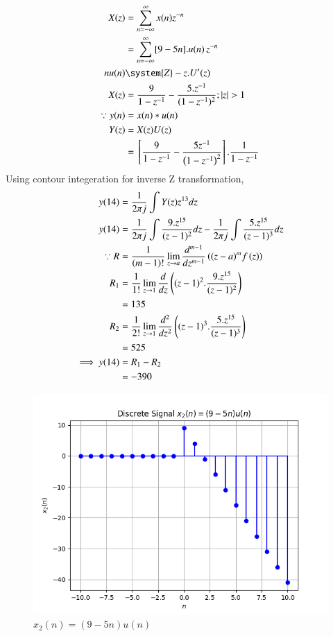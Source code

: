 \documentclass[journal,12pt,twocolumn]{IEEEtran}
\theoremstyle{remark}
\begin{document}
\begin{enumerate} [label=(\roman*)]
    \begin{align}
         X(z) &= \sum_{n = -\infty}^{\infty} x(n) z^{-n} \label{eq:z-transform}\\
          &= \sum_{n = -\infty}^{\infty}[9 - 5n].u(n) \, z^{-n} \\
        nu(n) &\system{Z} -z.U'(z)\\
         X(z) &= \frac{9}{1-z^{-1}} - \frac{5.z^{-1}}{(1-z^{-1})^2} ; |z|>1\\
        \because y(n) &= x(n) * u(n)\\
        Y(z) &= X(z)U(z)\\
         &= \sbrak{\frac{9}{1-z^{-1}} - \frac{5 z^{-1}}{\brak{1-z^{-1}}^2} }.\frac{1}{1-z^{-1}}
    \end{align}
    Using contour integeration for inverse Z transformation,\\
    \begin{align}
        y(14) &= \frac{1}{2\pi j}\int Y(z) z^{13} dz \\
        y(14) &= \frac{1}{2\pi j}\int \frac{9.z^{15}}{(z-1)^{2}} dz - \frac{1}{2\pi j}\int \frac{5.z^{15}}{(z-1)^{3}} dz\\
        \because R&=\frac{1}{\left(m-1\right)!}\lim\limits_{z\to a}\frac{d^{m-1}}{dz^{m-1}}\left({(z-a)}^{m}f\left(z\right)\right)\\
        R_1 &=\frac{1}{1!}\lim\limits_{z\to 1}\frac{d}{dz}\left((z-1)^2.\frac{9.z^{15}}{(z-1)^{2}}\right)\\
         &= 135\\
        R_2 &=\frac{1}{2!}\lim\limits_{z\to 1}\frac{d^2}{dz^2}\left((z-1)^3.\frac{5.z^{15}}{(z-1)^{3}}\right)\\
         &= 525\\
        \implies y(14) &= R_1 - R_2 \\
        &= -390
    \end{align}
    
    \begin{figure}[!h] 
    \centering
    \includegraphics[width=\columnwidth]{figs/signal_x2.png}
    \caption{$x_2(n)=(9-5n)u(n)$}
    \label{fig:Graph2}
    \end{figure}

\end{enumerate}
\end{document}
